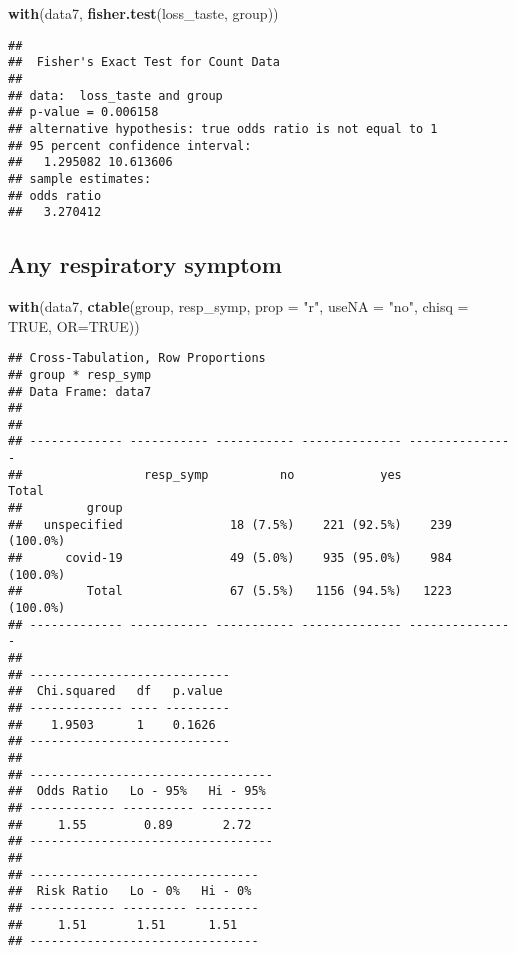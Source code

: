 \documentclass[
]{article}
\newenvironment{Shaded}{\begin{snugshade}}{\end{snugshade}}
\newcommand{\DataTypeTok}[1]{\textcolor[rgb]{0.13,0.29,0.53}{#1}}
\newcommand{\KeywordTok}[1]{\textcolor[rgb]{0.13,0.29,0.53}{\textbf{#1}}}
\newcommand{\NormalTok}[1]{#1}
\newcommand{\OtherTok}[1]{\textcolor[rgb]{0.56,0.35,0.01}{#1}}
\newcommand{\StringTok}[1]{\textcolor[rgb]{0.31,0.60,0.02}{#1}}
\begin{document}
\begin{Shaded}
\begin{Highlighting}[]
\KeywordTok{with}\NormalTok{(data7, }\KeywordTok{fisher.test}\NormalTok{(loss_taste, group))}
\end{Highlighting}
\end{Shaded}

\begin{verbatim}
## 
##  Fisher's Exact Test for Count Data
## 
## data:  loss_taste and group
## p-value = 0.006158
## alternative hypothesis: true odds ratio is not equal to 1
## 95 percent confidence interval:
##   1.295082 10.613606
## sample estimates:
## odds ratio 
##   3.270412
\end{verbatim}

\hypertarget{any-respiratory-symptom}{%
\subsection{Any respiratory symptom}\label{any-respiratory-symptom}}

\begin{Shaded}
\begin{Highlighting}[]
\KeywordTok{with}\NormalTok{(data7, }\KeywordTok{ctable}\NormalTok{(group, resp_symp, }\DataTypeTok{prop =} \StringTok{"r"}\NormalTok{, }\DataTypeTok{useNA =} \StringTok{"no"}\NormalTok{, }\DataTypeTok{chisq =} \OtherTok{TRUE}\NormalTok{, }\DataTypeTok{OR=}\OtherTok{TRUE}\NormalTok{))}
\end{Highlighting}
\end{Shaded}

\begin{verbatim}
## Cross-Tabulation, Row Proportions  
## group * resp_symp  
## Data Frame: data7  
## 
## 
## ------------- ----------- ----------- -------------- ---------------
##                 resp_symp          no            yes           Total
##         group                                                       
##   unspecified               18 (7.5%)    221 (92.5%)    239 (100.0%)
##      covid-19               49 (5.0%)    935 (95.0%)    984 (100.0%)
##         Total               67 (5.5%)   1156 (94.5%)   1223 (100.0%)
## ------------- ----------- ----------- -------------- ---------------
## 
## ----------------------------
##  Chi.squared   df   p.value 
## ------------- ---- ---------
##    1.9503      1    0.1626  
## ----------------------------
## 
## ----------------------------------
##  Odds Ratio   Lo - 95%   Hi - 95% 
## ------------ ---------- ----------
##     1.55        0.89       2.72   
## ----------------------------------
## 
## --------------------------------
##  Risk Ratio   Lo - 0%   Hi - 0% 
## ------------ --------- ---------
##     1.51       1.51      1.51   
## --------------------------------
\end{verbatim}
\end{document}
